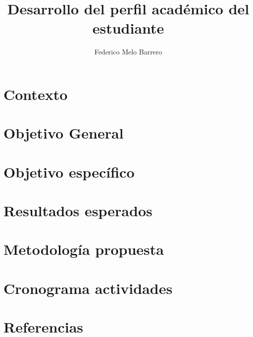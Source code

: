 \documentclass{fmbproyectogrado}
\title{Desarrollo del perfil académico del estudiante}
\author{Federico Melo Barrero\inst{1}}
\begin{document}
\maketitle

\section{Contexto}



\section{Objetivo General}



\section{Objetivo específico}



\section{Resultados esperados}



\section{Metodología propuesta}


\section{Cronograma actividades}


\section{Referencias}
\end{document}
